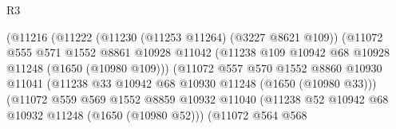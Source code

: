\begin{lexlean}{R3}
\begin{coremodule}
                                      (@11216
                                        (@11222
                                          (@11230 (@11253 @11264) (@3227 @8621 @109))
                                          (@11072
                                            @555
                                            @571
                                            @1552
                                            @8861
                                            @10928
                                            @11042
                                            (@11238
                                              @109
                                              @10942
                                              @68
                                              @10928
                                              @11248
                                              (@1650 (@10980 @109)))
                                            (@11072
                                              @557
                                              @570
                                              @1552
                                              @8860
                                              @10930
                                              @11041
                                              (@11238
                                                @33
                                                @10942
                                                @68
                                                @10930
                                                @11248
                                                (@1650 (@10980 @33)))
                                              (@11072
                                                @559
                                                @569
                                                @1552
                                                @8859
                                                @10932
                                                @11040
                                                (@11238
                                                  @52
                                                  @10942
                                                  @68
                                                  @10932
                                                  @11248
                                                  (@1650 (@10980 @52)))
                                                (@11072
                                                  @564
                                                  @568

\end{coremodule}
\end{lexlean}
